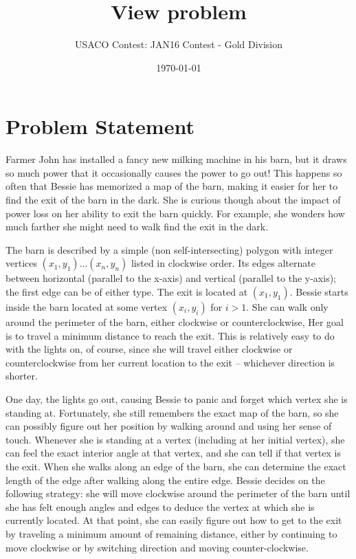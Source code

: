 \documentclass[12pt]{article}
\title{View problem}
\author{USACO Contest: JAN16 Contest - Gold Division}
\date{\today}
\begin{document}
\maketitle

\section*{Problem Statement}

Farmer John has installed a fancy new milking machine in his barn, but it draws
so much power that it occasionally causes the power to go out! This happens so
often that Bessie has memorized a map of the barn, making it easier for her to
find the exit of the barn in the dark. She is curious though about the impact of
power loss on her ability to exit the barn quickly. For example, she wonders how
much farther she might need to walk find the exit in the dark.

The barn is described by a simple (non self-intersecting) polygon with integer 
vertices $(x_1, y_1) \ldots (x_n, y_n)$ listed in clockwise order.  Its edges
alternate between horizontal (parallel to the x-axis) and vertical (parallel to
the y-axis); the first edge can be of either type. The exit is located at
$(x_1, y_1)$.  Bessie starts inside the barn located at some vertex 
$(x_i, y_i)$ for $i > 1$.  She can walk only around the perimeter of the barn,
either clockwise or counterclockwise, Her goal is to travel a minimum distance
to reach the exit. This is relatively easy to do with the lights on, of course,
since she will travel either clockwise or counterclockwise from her current
location to the  exit -- whichever direction is shorter.

One day, the lights go out, causing Bessie to panic and forget
which vertex she is standing at.  Fortunately, she still remembers the
exact map of the barn, so she can possibly figure out her position by
walking around and using her sense of touch.  Whenever she is standing
at a vertex (including at her initial vertex), she can feel the exact
interior angle at that vertex, and she can tell if that vertex is the
exit.  When she walks along an edge of the barn, she can determine the
exact length of the edge after walking along the entire edge.  Bessie
decides on the following strategy: she will move clockwise around the
perimeter of the barn until she has felt enough angles and edges to
deduce the vertex at which she is currently located.  At that point,
she can easily figure out how to get to the exit by traveling a
minimum amount of remaining distance, either by continuing to move
clockwise or by switching direction and moving counter-clockwise.
\end{document}

